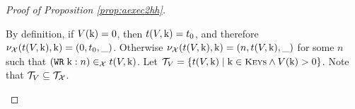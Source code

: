 \begin{proof}[Proof of Proposition \ref{prop:aexec2hh}]
\begin{itemize}
By definition, if $V(\mathrm{k}) = 0$, then $t(V, \mathrm{k}) = t_0$, and therefore
$\nu_{\mathcal{X}}(t({V},{\mathrm{k}}), \mathrm{k}) = 
(0, t_0, \_)$. Otherwise $\nu_{\mathcal{X}}(t({V}, \mathrm{k}), \mathrm{k}) = 
(n, t(V, \mathrm{k}), \_)$ for some $n$ such that 
$({{\tt WR}}\; \mathrm{k}: n) \in_{\mathcal{X}} t(V, \mathrm{k})$. 
Let $\T_{V} = \{ \tsid(V, \key{k}) \mid \key{k} \in \Addr \wedge V(\key{k}) > 0 \}$. 
Note that $\mathcal{T}_{V} \subseteq \mathcal{T}_{\mathcal{X}}$.


\end{itemize}
\end{proof}
